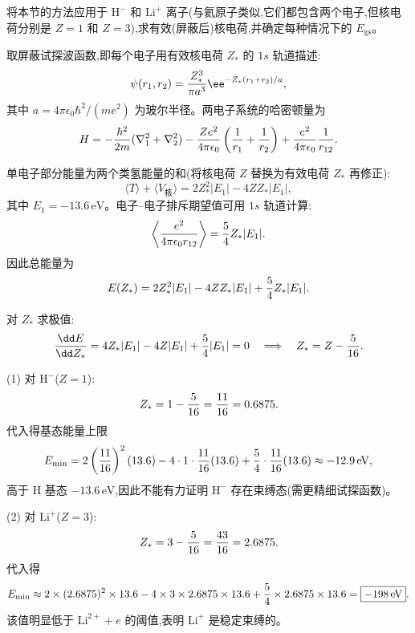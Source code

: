 \begin{question}
将本节的方法应用于 $\mathrm{H}^-$ 和 $\mathrm{Li}^+$ 离子(与氦原子类似,它们都包含两个电子,但核电荷分别是 $Z=1$ 和 $Z=3$),求有效(屏蔽后)核电荷,并确定每种情况下的 $E_{\mathrm{gs}}$。
\begin{solution}
取屏蔽试探波函数,即每个电子用有效核电荷 $Z_*$ 的 $1s$ 轨道描述:
\[
\psi(r_1,r_2)={Z_*^3\over\pi a^3}\ee^{-Z_*(r_1+r_2)/a},
\]
其中 $a=4\pi\epsilon_0\hbar^2/(me^2)$ 为玻尔半径。两电子系统的哈密顿量为
\[
H=-{\hbar^2\over2m}(\nabla_1^2+\nabla_2^2)-{Ze^2\over4\pi\epsilon_0}\left({1\over r_1}+{1\over r_2}\right)
+{e^2\over4\pi\epsilon_0}{1\over r_{12}}.
\]

单电子部分能量为两个类氢能量的和(将核电荷 $Z$ 替换为有效电荷 $Z_*$ 再修正):
\[
\langle T\rangle+ \langle V_{\text{核}}\rangle
=2Z_*^2|E_1|-4ZZ_*|E_1|,
\]
其中 $E_1=-13.6\,\mathrm{eV}$。电子--电子排斥期望值可用 $1s$ 轨道计算:
\[
\left\langle{e^2\over4\pi\epsilon_0 r_{12}}\right\rangle
={5\over4}Z_*|E_1|.
\]
因此总能量为
\[
E(Z_*)=2Z_*^2|E_1|-4ZZ_*|E_1|+{5\over4}Z_*|E_1|.
\]

对 $Z_*$ 求极值:
\[
{\dd E\over\dd Z_*}=4Z_*|E_1|-4Z|E_1|+{5\over4}|E_1|=0
\quad\Longrightarrow\quad
Z_*=Z-{5\over16}.
\]

(1) 对 $\mathrm H^-$($Z=1$):
\[
Z_*=1-{5\over16}={11\over16}=0.6875.
\]
代入得基态能量上限
\[
E_{\min}=2\left({11\over16}\right)^2(13.6)-4\cdot1\cdot{11\over16}(13.6)+{5\over4}\cdot{11\over16}(13.6)
\approx-12.9\,\mathrm{eV},
\]
高于 $\mathrm H$ 基态 $-13.6\,\mathrm{eV}$,因此不能有力证明 $\mathrm H^-$ 存在束缚态(需更精细试探函数)。

(2) 对 $\mathrm{Li}^+$($Z=3$):
\[
Z_*=3-{5\over16}={43\over16}=2.6875.
\]
代入得
\[
E_{\min}\approx2\times(2.6875)^2\times13.6-4\times3\times2.6875\times13.6+{5\over4}\times2.6875\times13.6
=\boxed{-198\,\mathrm{eV}}.
\]
该值明显低于 $\mathrm{Li}^{2+}+e$ 的阈值,表明 $\mathrm{Li}^+$ 是稳定束缚的。
\end{solution}
\end{question}


